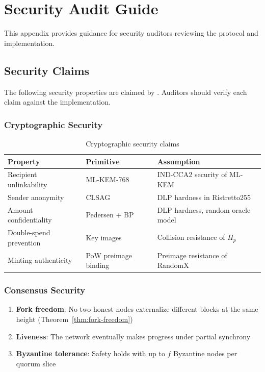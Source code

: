 
\section{Security Audit Guide}
\label{app:audit}

This appendix provides guidance for security auditors reviewing the \Botho
protocol and implementation.

\subsection{Security Claims}

The following security properties are claimed by \Botho. Auditors should
verify each claim against the implementation.

\subsubsection{Cryptographic Security}

\begin{table}[h]
\centering
\caption{Cryptographic security claims}
\label{tab:crypto-claims}
\begin{tabular}{@{}p{4cm}p{3cm}p{6cm}@{}}
\toprule
\textbf{Property} & \textbf{Primitive} & \textbf{Assumption} \\
\midrule
Recipient unlinkability & ML-KEM-768 & IND-CCA2 security of ML-KEM \\
Sender anonymity & CLSAG & DLP hardness in Ristretto255 \\
Amount confidentiality & Pedersen + BP & DLP hardness, random oracle model \\
Double-spend prevention & Key images & Collision resistance of $H_p$ \\
Minting authenticity & PoW preimage binding & Preimage resistance of RandomX \\
\bottomrule
\end{tabular}
\end{table}

\subsubsection{Consensus Security}

\begin{enumerate}
  \item \textbf{Fork freedom}: No two honest nodes externalize different
    blocks at the same height (Theorem~\ref{thm:fork-freedom})
  \item \textbf{Liveness}: The network eventually makes progress under
    partial synchrony
  \item \textbf{Byzantine tolerance}: Safety holds with up to $f$ Byzantine
    nodes per quorum slice
\end{enumerate}

